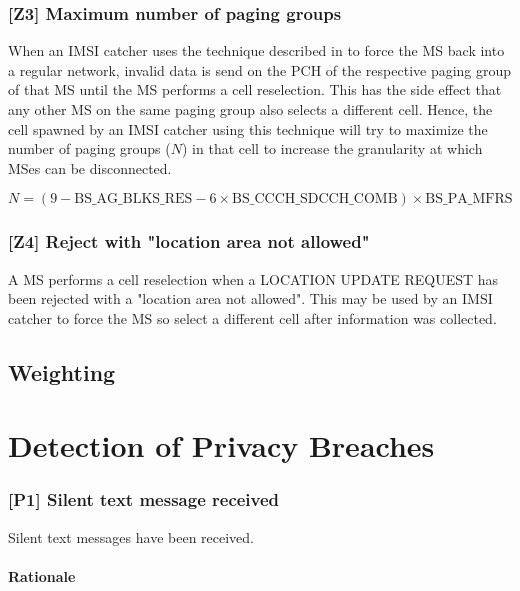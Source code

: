 \documentclass[a4paper,11pt,notitlepage,bigheadings,oneside]{scrartcl}
\begin{document}
\subsubsection{[Z3] Maximum number of paging groups}

When an IMSI catcher uses the technique described in
\cite[0021]{bott2000verfahren} to force the MS back into a regular network,
invalid data is send on the PCH of the respective paging group of that MS until
the MS performs a cell reselection. This has the side effect that any other MS
on the same paging group also selects a different cell. Hence, the cell spawned
by an IMSI catcher using this technique will try to maximize the number of
paging groups ($N$) in that cell to increase the granularity at which MSes can
be disconnected.

${N} = (9 - {\text{BS\_AG\_BLKS\_RES}} - 6\times {\text{BS\_CCCH\_SDCCH\_COMB}})\times {\text{BS\_PA\_MFRS}}$


\subsubsection{[Z4] Reject with "location area not allowed"}

A MS performs a cell reselection when a LOCATION UPDATE REQUEST has been
rejected with a "location area not allowed". This may be used by an IMSI
catcher to force the MS so select a different cell after information was
collected.


\subsection{Weighting}

\section{Detection of Privacy Breaches}
\label{sec:detection_of_privacy_breaches}

\subsubsection{[P1] Silent text message received}

Silent text messages have been received.

\paragraph{Rationale}
\end{document}
